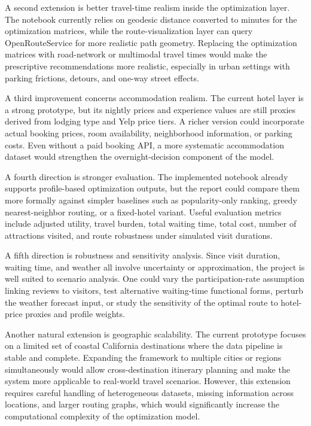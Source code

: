 \documentclass[12pt,a4paper]{article}
\begin{document}
A second extension is better travel-time realism inside the optimization layer. The notebook currently relies on geodesic distance converted to minutes for the optimization matrices, while the route-visualization layer can query OpenRouteService for more realistic path geometry. Replacing the optimization matrices with road-network or multimodal travel times would make the prescriptive recommendations more realistic, especially in urban settings with parking frictions, detours, and one-way street effects.

A third improvement concerns accommodation realism. The current hotel layer is a strong prototype, but its nightly prices and experience values are still proxies derived from lodging type and Yelp price tiers. A richer version could incorporate actual booking prices, room availability, neighborhood information, or parking costs. Even without a paid booking API, a more systematic accommodation dataset would strengthen the overnight-decision component of the model.

A fourth direction is stronger evaluation. The implemented notebook already supports profile-based optimization outputs, but the report could compare them more formally against simpler baselines such as popularity-only ranking, greedy nearest-neighbor routing, or a fixed-hotel variant. Useful evaluation metrics include adjusted utility, travel burden, total waiting time, total cost, number of attractions visited, and route robustness under simulated visit durations.

A fifth direction is robustness and sensitivity analysis. Since visit duration, waiting time, and weather all involve uncertainty or approximation, the project is well suited to scenario analysis. One could vary the participation-rate assumption linking reviews to visitors, test alternative waiting-time functional forms, perturb the weather forecast input, or study the sensitivity of the optimal route to hotel-price proxies and profile weights.

Another natural extension is geographic scalability. The current prototype focuses on a limited set of coastal California destinations where the data pipeline is stable and complete. Expanding the framework to multiple cities or regions simultaneously would allow cross-destination itinerary planning and make the system more applicable to real-world travel scenarios. However, this extension requires careful handling of heterogeneous datasets, missing information across locations, and larger routing graphs, which would significantly increase the computational complexity of the optimization model.
\end{document}
